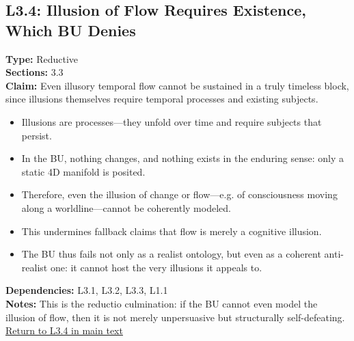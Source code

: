 \documentclass[12pt]{book}
\newcommand{\returnlink}[1]{\hyperref[logic:#1]{Return to #1 in main text}\xspace}
\begin{document}
\subsection*{L3.4: Illusion of Flow Requires Existence, Which BU Denies}\label{appendix:L3.4}
\textbf{Type:} Reductive \\
\textbf{Sections:} 3.3 \\
\textbf{Claim:} Even illusory temporal flow cannot be sustained in a truly timeless block, since illusions themselves require temporal processes and existing subjects.
\begin{itemize}
  \item Illusions are processes---they unfold over time and require subjects that persist.
  \item In the BU, nothing changes, and nothing exists in the enduring sense: only a static 4D manifold is posited.
  \item Therefore, even the illusion of change or flow---e.g. of consciousness moving along a worldline---cannot be coherently modeled.
  \item This undermines fallback claims that flow is merely a cognitive illusion.
  \item The BU thus fails not only as a realist ontology, but even as a coherent anti-realist one: it cannot host the very illusions it appeals to.
\end{itemize}
\textbf{Dependencies:} L3.1, L3.2, L3.3, L1.1 \\
\textbf{Notes:} This is the reductio culmination: if the BU cannot even model the illusion of flow, then it is not merely unpersuasive but structurally self-defeating.\\
\returnlink{L3.4}
\end{document}
